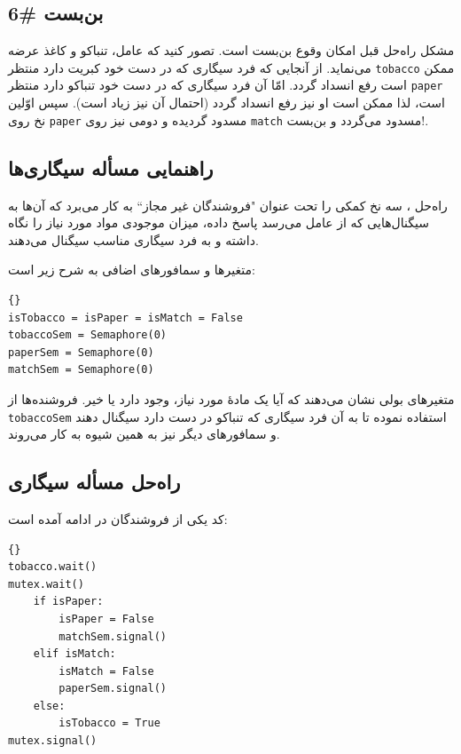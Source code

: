 \documentclass{book}
\newcommand{\clearemptydoublepage}{\newpage\cleardoublepage}
\begin{document}
\clearemptydoublepage
\subsection{بن‌بست \#6}

    مشکل راه‌حل قبل امکان وقوع بن‌بست است. تصور کنید که عامل، تنباکو و کاغذ عرضه می‌نماید. از آنجایی که فرد  سیگاری‌ که در دست خود کبریت دارد 
    منتظر {\tt tobacco} ممکن است رفع انسداد گردد. امّا آن فرد سیگاری که در دست خود تنباکو دارد منتظر {\tt paper} است، لذا ممکن است او نیز 
    رفع انسداد گردد (احتمال آن نیز زیاد است). سپس اوّلین نخ روی {\tt paper} مسدود گردیده و دومی نیز روی {\tt match} مسدود می‌گردد و بن‌بست!. 

\clearemptydoublepage
\subsection{راهنمایی مسأله سیگاری‌ها}

    راه‌حل ، 
    سه نخ کمکی را  تحت عنوان "فروشندگان غیر مجاز`` به کار می‌برد که آن‌ها به سیگنال‌هایی که از عامل‌
    می‌رسد پاسخ داده، میزان موجودی مواد مورد نیاز را نگاه داشته و به فرد سیگاری مناسب سیگنال می‌دهند. 

    متغیرها و سمافورهای اضافی به شرح زیر است: 

\begin{latin}
\begin{lstlisting}[title=\rl{راهنمایی مسأله سیگاری‌ها}]{}
isTobacco = isPaper = isMatch = False
tobaccoSem = Semaphore(0)
paperSem = Semaphore(0)
matchSem = Semaphore(0)
\end{lstlisting}
\end{latin}

    متغیرهای بولی نشان می‌دهند که آیا یک مادهٔ مورد نیاز، وجود دارد یا خیر. 
    فروشنده‌‌ها از {\tt tobaccoSem} استفاده نموده تا به آن فرد سیگاری که تنباکو در دست دارد سیگنال دهند و سمافورهای دیگر نیز به همین شیوه به کار می‌روند.


\clearemptydoublepage
\subsection{راه‌حل مسأله سیگاری}

    کد یکی از فروشندگان در ادامه آمده است:‌

\begin{latin}
\begin{lstlisting}[title=\rl{فروشنده \lr{A}}]{}
tobacco.wait()
mutex.wait()
    if isPaper:
        isPaper = False
        matchSem.signal()
    elif isMatch:
        isMatch = False
        paperSem.signal()
    else: 
        isTobacco = True
mutex.signal()
\end{lstlisting}
\end{latin}
\end{document}

